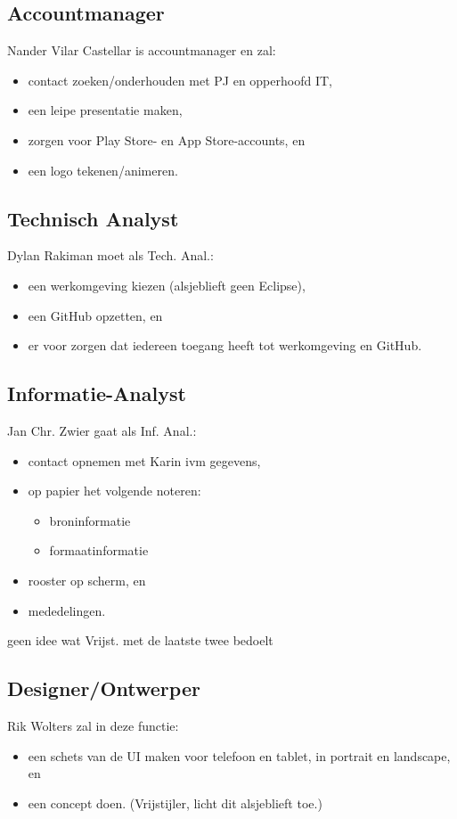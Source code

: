 \documentclass[a4paper, 10pt]{article}
\begin{document}
\subsection{Accountmanager}
Nander Vilar Castellar is accountmanager en zal:
\begin{itemize}
	\item contact zoeken/onderhouden met PJ en opperhoofd IT,
	\item een leipe presentatie maken,
	\item zorgen voor Play Store- en App Store-accounts, en
	\item een logo tekenen/animeren.
\end{itemize}

\subsection{Technisch Analyst}
Dylan Rakiman moet als Tech. Anal.:
\begin{itemize}
	\item een werkomgeving kiezen (alsjeblieft geen Eclipse),
	\item een GitHub opzetten, en
	\item er voor zorgen dat iedereen toegang heeft tot werkomgeving en
		GitHub.
\end{itemize}

\subsection{Informatie-Analyst}
Jan Chr. Zwier gaat als Inf. Anal.:
\begin{itemize}
	\item contact opnemen met Karin ivm gegevens,
	\item op papier het volgende noteren:
	\begin{itemize}
		\item broninformatie
		\item formaatinformatie
	\end{itemize}
	\item rooster op scherm, en
	\item mededelingen.
\end{itemize}
geen idee wat Vrijst. met de laatste twee bedoelt

\subsection{Designer/Ontwerper}
Rik Wolters zal in deze functie:
\begin{itemize}
	\item een schets van de UI maken voor telefoon en tablet, in portrait en
		landscape, en
	\item een concept doen. (Vrijstijler, licht dit alsjeblieft toe.)
\end{itemize}
\end{document}
